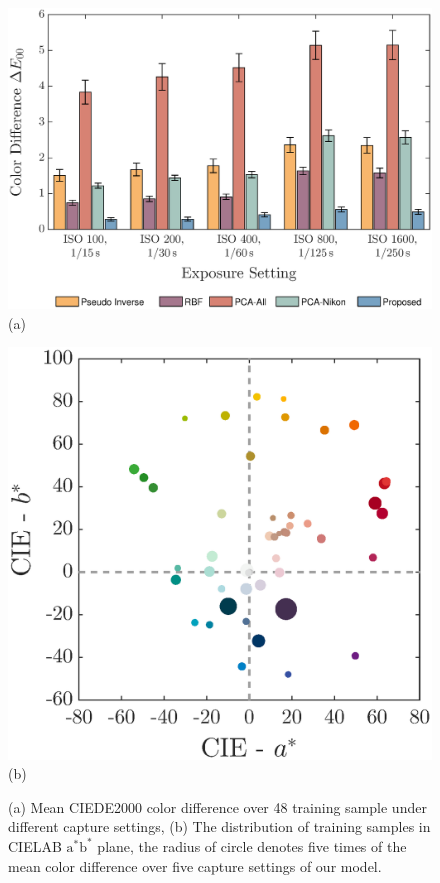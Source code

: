 \documentclass[9pt,twocolumn,twoside]{osajnl}
\begin{document}
	\begin{figure}[tbp]
		\centering
		\begin{minipage}[b]{0.57\linewidth}
			\centering
			\includegraphics[width=\linewidth]{Fig12a}\\
			(a)
		\end{minipage}%
		\begin{minipage}[b]{0.43\linewidth}
			\centering
			\includegraphics[width=\linewidth]{Fig12b}\\
			(b)
		\end{minipage}
		\caption{(a) Mean CIEDE2000 color difference over 48 training sample under different capture settings, (b) The distribution of training samples in CIELAB $\text{a}^*\text{b}^*$ plane, the radius of circle denotes five times of the mean color difference over five capture settings of our model.}
		\label{fig:12}
	\end{figure}
	
\end{document}
